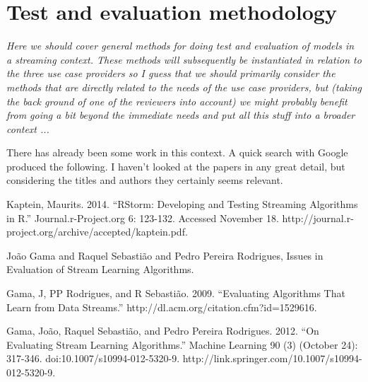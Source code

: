 \section{Test and evaluation methodology}

\emph{Here we should cover general methods for doing test and evaluation of models in a streaming
  context. These methods will subsequently be instantiated in relation to the three use case providers so I
  guess that we should primarily consider the methods that are directly related to the needs of the use case
  providers, but (taking the back ground of one of the reviewers into account) we might probably benefit from
  going a bit beyond the immediate needs and put all this stuff into a broader context ...}


There has already been some work in this context. A quick search with Google produced the following. I haven't
looked at the papers in any great detail, but considering the titles and authors they certainly seems relevant. 

Kaptein, Maurits. 2014. ``RStorm: Developing and Testing Streaming Algorithms in R.'' Journal.r-Project.org 6:
123-132. Accessed November 18. http://journal.r-project.org/archive/accepted/kaptein.pdf.


Jo{\~a}o Gama and Raquel Sebasti{\~a}o and Pedro Pereira Rodrigues, Issues in Evaluation of Stream Learning
Algorithms.

Gama, J, PP Rodrigues, and R Sebasti{\~a}o. 2009. ``Evaluating Algorithms That Learn from Data Streams.''  http://dl.acm.org/citation.cfm?id=1529616.

Gama, Jo{\~a}o, Raquel Sebasti{\~a}o, and Pedro Pereira Rodrigues. 2012. ``On Evaluating Stream Learning
Algorithms.'' Machine Learning 90 (3) (October 24):
317-346. doi:10.1007/s10994-012-5320-9. http://link.springer.com/10.1007/s10994-012-5320-9.


